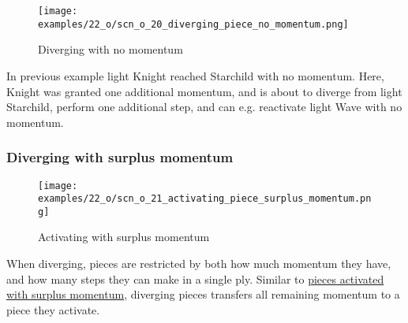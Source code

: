 \clearpage %

\vspace*{-2.3\baselineskip}
\noindent
\begin{wrapfigure}[8]{l}{0.4\textwidth}
\centering
\texttt{[image: examples/22\_o/scn\_o\_20\_diverging\_piece\_no\_momentum.png]}
\vspace*{-0.4\baselineskip}
\caption{Diverging with no momentum}
\label{fig:scn_o_20_diverging_piece_no_momentum}
\end{wrapfigure}
In previous example light Knight reached Starchild with no momentum. Here, Knight
was granted one additional momentum, and is about to diverge from light Starchild,
perform one additional step, and can e.g. reactivate light Wave with no momentum.

\vspace*{0.9\baselineskip}
\subsubsection*{Diverging with surplus momentum}
\label{sec:One/Starchild/Divergence/Diverging with surplus momentum}

\vspace*{-0.9\baselineskip}
\noindent
\begin{wrapfigure}[9]{l}{0.4\textwidth}
\centering
\texttt{[image: examples/22\_o/scn\_o\_21\_activating\_piece\_surplus\_momentum.png]}
\vspace*{-0.4\baselineskip}
\caption{Activating with surplus momentum}
\label{fig:scn_o_21_activating_piece_surplus_momentum}
\end{wrapfigure}
When diverging, pieces are restricted by both how much momentum they have, and how
many steps they can make in a single ply. \newline
\indent
Similar to
\hyperref[fig:scn_mv_32_single_step_piece_momentum]{pieces activated with surplus momentum},
diverging pieces transfers all remaining momentum to a piece they activate.

\hspace*{\fill} %

